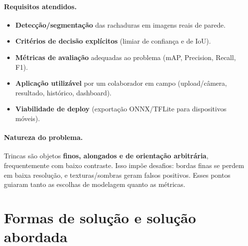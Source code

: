\documentclass[11pt,a4paper]{article}
\begin{document}
\paragraph{Requisitos atendidos.}
\begin{itemize}[leftmargin=1.4em]
  \item \textbf{Detecção/segmentação} das rachaduras em imagens reais de parede.
  \item \textbf{Critérios de decisão explícitos} (limiar de confiança e de IoU).
  \item \textbf{Métricas de avaliação} adequadas ao problema (mAP, Precision, Recall, F1).
  \item \textbf{Aplicação utilizável} por um colaborador em campo (upload/câmera, resultado,
        histórico, dashboard).
  \item \textbf{Viabilidade de deploy} (exportação ONNX/TFLite para dispositivos móveis).
\end{itemize}

\paragraph{Natureza do problema.} Trincas são objetos \textbf{finos, alongados e de orientação
arbitrária}, frequentemente com baixo contraste. Isso impõe desafios: bordas finas se perdem
em baixa resolução, e texturas/sombras geram falsos positivos. Esses pontos guiaram tanto as
escolhas de modelagem quanto as métricas.

\section{Formas de solução e solução abordada}
\end{document}
